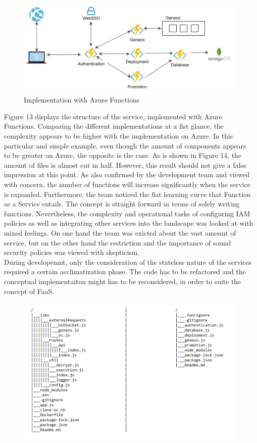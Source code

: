 \documentclass[a4paper,twoside,11pt, pagesize]{scrartcl}
\begin{document}
\begin{spacing}{1.2}
\begin{figure}[H]
\label{fig:azure}
\centering
\includegraphics[width=1\textwidth]{azure.jpg}
\caption{Implementation with Azure Functions}
\end{figure} 
Figure 13 displays the structure of the service, implemented with Azure Functions. Comparing the different implementations at a fist glance, the complexity appears to be higher with the implementation on Azure. In this particular and simple example, even though the amount of components appears to be greater on Azure, the opposite is the case. As is shown in Figure 14, the amount of files is almost cut in half. However, this result should not give a false impression at this point. As also confirmed by the development team and viewed with concern, the number of functions will increase significantly when the service is expanded. Furthermore, the team noticed the flat learning curve that Function as a Service entails. The concept is straight forward in terms of solely writing functions. Nevertheless, the complexity and operational tasks of configuring IAM policies as well as integrating other services into the landscape was looked at with mixed feelings. On one hand the team was exicted about the vast amount of service, but on the other hand the restriction and the importance of sound security policies was viewed with skepticism.\\
During developemnt, only the consideration of the stateless nature of the services required a certain acclimatization phase. The code has to be refactored and the conceptual implementaiton might has to be reconsidered, in order to suite the concept of FaaS. 
\begin{figure}[H]
\label{fig:tree2}
\centering
\includegraphics[width=1\textwidth]{tree2.png}

\end{figure}
\end{spacing}
\end{document}
